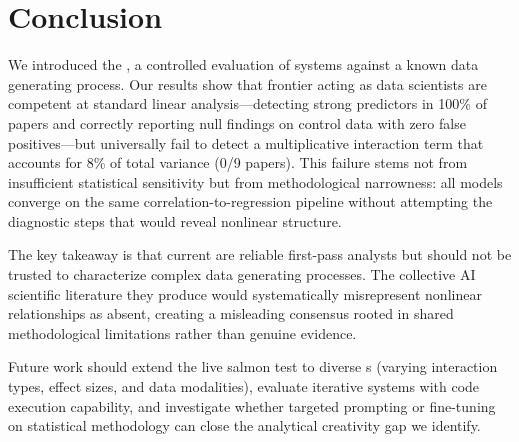 \section{Conclusion}
\label{sec:conclusion}

We introduced the \livesalmon, a controlled evaluation of \aiscientist systems against a known data generating process.
Our results show that frontier \llms acting as data scientists are competent at standard linear analysis---detecting strong predictors in 100\% of papers and correctly reporting null findings on control data with zero false positives---but universally fail to detect a multiplicative interaction term that accounts for 8\% of total variance (0/9 papers).
This failure stems not from insufficient statistical sensitivity but from methodological narrowness: all models converge on the same correlation-to-regression pipeline without attempting the diagnostic steps that would reveal nonlinear structure.

The key takeaway is that current \aiscientists are reliable first-pass analysts but should not be trusted to characterize complex data generating processes.
The collective AI scientific literature they produce would systematically misrepresent nonlinear relationships as absent, creating a misleading consensus rooted in shared methodological limitations rather than genuine evidence.

Future work should extend the live salmon test to diverse \dgp{}s (varying interaction types, effect sizes, and data modalities), evaluate iterative \aiscientist systems with code execution capability, and investigate whether targeted prompting or fine-tuning on statistical methodology can close the analytical creativity gap we identify.
